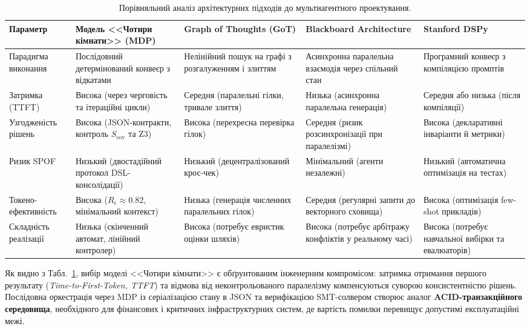 \documentclass[12pt, reqno, a4paper]{amsart}
\theoremstyle{definition}
\theoremstyle{plain}
\theoremstyle{plain}
\theoremstyle{plain}
\theoremstyle{remark}
\theoremstyle{plain}
\begin{document}
{\begin{table}[htbp]
  \centering
  \caption{Порівняльний аналіз архітектурних підходів до мультиагентного проектування.}
  \label{tab:comparison}
  {\scriptsize
  \begin{tabular}{|p{2.15cm}|p{2.4cm}|p{2.25cm}|p{2.25cm}|p{2.2cm}|}
  \hline
  \raggedright\textbf{Параметр} & \raggedright\textbf{Модель <<Чотири кімнати>> (MDP)} & \raggedright\textbf{Graph of Thoughts (GoT)} & \raggedright\textbf{Blackboard Architecture} & \raggedright\textbf{Stanford DSPy} \tabularnewline \hline
  \raggedright Парадигма виконання & \raggedright Послідовний детермінований конвеєр з відкатами & \raggedright Нелінійний пошук на графі з розгалуженням і злиттям & \raggedright Асинхронна паралельна взаємодія через спільний стан & \raggedright Програмний конвеєр з компіляцією промптів \tabularnewline \hline
  \raggedright Затримка (TTFT) & \raggedright Висока (через черговість та ітераційні цикли) & \raggedright Середня (паралельні гілки, тривале злиття) & \raggedright Низька (асинхронна паралельна генерація) & \raggedright Середня або низька (після компіляції) \tabularnewline \hline
  \raggedright Узгодженість рішень & \raggedright Висока (JSON-контракти, контроль $S_{\text{cov}}$ та Z3) & \raggedright Висока (перехресна перевірка гілок) & \raggedright Середня (ризик розсинхронізації при паралелізмі) & \raggedright Висока (декларативні інваріанти й метрики) \tabularnewline \hline
  \raggedright Ризик SPOF & \raggedright Низький (двостадійний протокол DSL-консолідації) & \raggedright Низький (децентралізований крос-чек) & \raggedright Мінімальний (агенти незалежні) & \raggedright Низький (автоматична оптимізація на тестах) \tabularnewline \hline
  \raggedright Токено-ефективність & \raggedright Висока ($R_{\text{c}} \approx 0.82$, мінімальний контекст) & \raggedright Низька (генерація численних паралельних гілок) & \raggedright Середня (регулярні запити до векторного сховища) & \raggedright Висока (оптимізація few-shot прикладів) \tabularnewline \hline
  \raggedright Складність реалізації & \raggedright Низька (скінченний автомат, лінійний контролер) & \raggedright Висока (потребує евристик оцінки шляхів) & \raggedright Висока (потребує арбітражу конфліктів у реальному часі) & \raggedright Висока (потребує навчальної вибірки та евалюаторів) \tabularnewline \hline
  \end{tabular}
  }
\end{table}

Як видно з Табл.~\ref{tab:comparison}, вибір моделі <<Чотири кімнати>> є обґрунтованим інженерним компромісом: затримка отримання першого результату (\textit{Time-to-First-Token, TTFT}) та відмова від неконтрольованого паралелізму компенсуються суворою консистентністю рішень. Послідовна оркестрація через MDP із серіалізацією стану в JSON та верифікацією SMT-солвером створює аналог \textbf{ACID-транзакційного середовища}, необхідного для фінансових і критичних інфраструктурних систем, де вартість помилки перевищує допустимі експлуатаційні межі.

}
\end{document}

